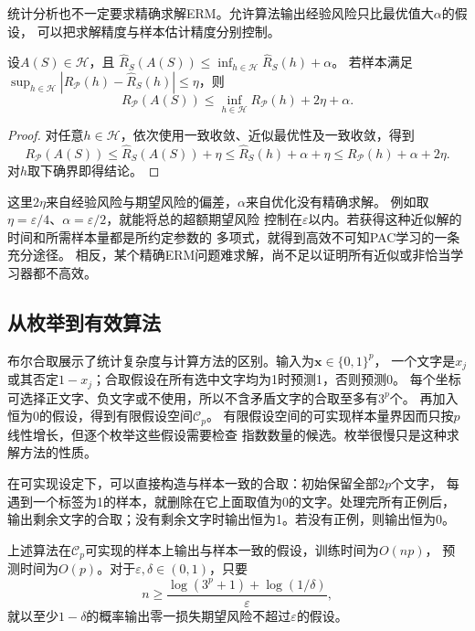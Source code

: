 统计分析也不一定要求精确求解ERM。允许算法输出经验风险只比最优值大$\alpha$的假设，
可以把求解精度与样本估计精度分别控制。

\begin{theorem}[近似ERM的期望风险保证]
\label{thm:approximate-erm-risk}
设$A(S)\in\mathcal H$，且
$\hat R_S(A(S))\leq\inf_{h\in\mathcal H}\hat R_S(h)+\alpha$。
若样本满足$\sup_{h\in\mathcal H}|R_{\mathcal P}(h)-\hat R_S(h)|\leq\eta$，则
\[
 R_{\mathcal P}(A(S))
 \leq\inf_{h\in\mathcal H}R_{\mathcal P}(h)+2\eta+\alpha.
\]
\end{theorem}

\begin{proof}
对任意$h\in\mathcal H$，依次使用一致收敛、近似最优性及一致收敛，得到
\[
 R_{\mathcal P}(A(S))
 \leq\hat R_S(A(S))+\eta
 \leq\hat R_S(h)+\alpha+\eta
 \leq R_{\mathcal P}(h)+\alpha+2\eta.
\]
对$h$取下确界即得结论。
\end{proof}

这里$2\eta$来自经验风险与期望风险的偏差，$\alpha$来自优化没有精确求解。
例如取$\eta=\varepsilon/4$、$\alpha=\varepsilon/2$，就能将总的超额期望风险
控制在$\varepsilon$以内。若获得这种近似解的时间和所需样本量都是所约定参数的
多项式，就得到高效不可知PAC学习的一条充分途径。
相反，某个精确ERM问题难求解，尚不足以证明所有近似或非恰当学习器都不高效。

\subsection{从枚举到有效算法}

布尔合取展示了统计复杂度与计算方法的区别。输入为$\bm x\in\{0,1\}^p$，
一个文字是$x_j$或其否定$1-x_j$；合取假设在所有选中文字均为1时预测1，否则预测0。
每个坐标可选择正文字、负文字或不使用，所以不含矛盾文字的合取至多有$3^p$个。
再加入恒为0的假设，得到有限假设空间$\mathcal C_p$。
有限假设空间的可实现样本量界因而只按$p$线性增长，但逐个枚举这些假设需要检查
指数数量的候选。枚举很慢只是这种求解方法的性质。

在可实现设定下，可以直接构造与样本一致的合取：初始保留全部$2p$个文字，
每遇到一个标签为1的样本，就删除在它上面取值为0的文字。处理完所有正例后，
输出剩余文字的合取；没有剩余文字时输出恒为1。若没有正例，则输出恒为0。

\begin{theorem}[布尔合取的高效可实现学习]
\label{thm:efficient-conjunction-learning}
上述算法在$\mathcal C_p$可实现的样本上输出与样本一致的假设，训练时间为$O(np)$，
预测时间为$O(p)$。对于$\varepsilon,\delta\in(0,1)$，只要
\[
 n\geq\frac{\log(3^p+1)+\log(1/\delta)}{\varepsilon},
\]
就以至少$1-\delta$的概率输出零一损失期望风险不超过$\varepsilon$的假设。
\end{theorem}

